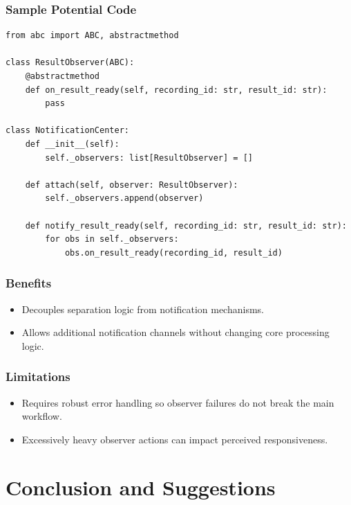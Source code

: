 \documentclass[12pt,a4paper]{report}
\begin{document}
\subsubsection*{Sample Potential Code}
\begin{lstlisting}[style=pystyle,caption={Observer pattern for result notifications.}]
from abc import ABC, abstractmethod

class ResultObserver(ABC):
    @abstractmethod
    def on_result_ready(self, recording_id: str, result_id: str):
        pass

class NotificationCenter:
    def __init__(self):
        self._observers: list[ResultObserver] = []

    def attach(self, observer: ResultObserver):
        self._observers.append(observer)

    def notify_result_ready(self, recording_id: str, result_id: str):
        for obs in self._observers:
            obs.on_result_ready(recording_id, result_id)
\end{lstlisting}

\subsubsection*{Benefits}
\begin{itemize}[nosep]
  \item Decouples separation logic from notification mechanisms.
  \item Allows additional notification channels without changing core processing logic.
\end{itemize}

\subsubsection*{Limitations}
\begin{itemize}[nosep]
  \item Requires robust error handling so observer failures do not break the main workflow.
  \item Excessively heavy observer actions can impact perceived responsiveness.
\end{itemize}

\section{Conclusion and Suggestions}
\end{document}
